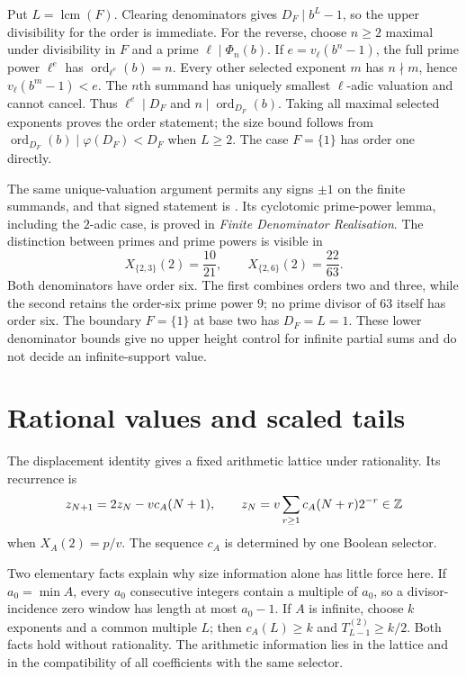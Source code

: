 \documentclass[11pt]{article}
\begin{document}
Put $L=\operatorname{lcm}(F)$.  Clearing denominators gives
$D_F\mid b^L-1$, so the upper divisibility for the order is immediate.
For the reverse, choose $n\ge2$ maximal under divisibility in $F$ and a
prime $\ell\mid\Phi_n(b)$.  If $e=v_\ell(b^n-1)$, the full prime power
$\ell^e$ has $\operatorname{ord}_{\ell^e}(b)=n$.
Every other selected exponent $m$ has $n\nmid m$, hence
$v_\ell(b^m-1)<e$.  The $n$th summand has uniquely smallest $\ell$-adic
valuation and cannot cancel.  Thus $\ell^e\mid D_F$ and
$n\mid\operatorname{ord}_{D_F}(b)$.  Taking all maximal selected exponents
proves the order statement; the size bound follows from
$\operatorname{ord}_{D_F}(b)\mid\varphi(D_F)<D_F$ when $L\ge2$.
The case $F=\{1\}$ has order one directly.

The same unique-valuation argument permits any signs $\pm1$ on the
finite summands, and that signed statement is
\href{https://github.com/wcook04/plectis-erdos/blob/f36a98bf3d3e6f65f1074e3b800e3293d5b8a51a/ErdosProblems/Erdos257/SignedFinitePeriodNoncollapse.lean#L507}{}.  Its cyclotomic prime-power lemma, including the
$2$-adic case, is proved in \emph{Finite Denominator Realisation}.
The distinction between primes and prime powers is visible in
\[
 X_{\{2,3\}}(2)=\frac{10}{21},\qquad
 X_{\{2,6\}}(2)=\frac{22}{63}.
\]
Both denominators have order six.  The first combines orders two and
three, while the second retains the order-six prime power $9$;
no prime divisor of $63$ itself has order six.
The boundary $F=\{1\}$ at base two has $D_F=L=1$.
These lower denominator bounds give no upper height control for infinite
partial sums and do not decide an infinite-support value.

\section{Rational values and scaled tails}\label{sec:forced}
The displacement identity gives a fixed arithmetic lattice under rationality.
Its recurrence is
\[
 z_{N+1}=2z_N-vc_A(N+1),\qquad
 z_N=v\sum_{r\ge1}c_A(N+r)2^{-r}\in\mathbb{Z}
\]
when $X_A(2)=p/v$.  The sequence $c_A$ is determined by one Boolean selector.

Two elementary facts explain why size information alone has little force
here.  If $a_0=\min A$, every $a_0$ consecutive integers contain a multiple
of $a_0$, so a divisor-incidence zero window has length at most $a_0-1$.
If $A$ is infinite, choose $k$ exponents and a common multiple $L$;
then $c_A(L)\ge k$ and $T_{L-1}^{(2)}\ge k/2$.
Both facts hold without rationality.  The arithmetic information lies in
the lattice and in the compatibility of all coefficients with the same
selector.
\end{document}
